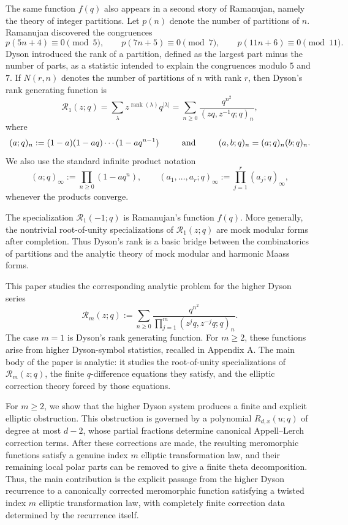 \documentclass[12pt]{amsart}
\numberwithin{equation}{section}
\begin{document}
The same function $f(q)$ also appears in a second story of Ramanujan, namely the theory of integer partitions.  Let $p(n)$ denote the number of partitions of $n$.  Ramanujan discovered the congruences
\[
p(5n+4)\equiv 0\pmod 5,\qquad
p(7n+5)\equiv 0\pmod 7,\qquad
p(11n+6)\equiv 0\pmod {11}.
\]
Dyson introduced the rank of a partition, defined as the largest part minus the number of parts, as a statistic intended to explain the congruences modulo $5$ and $7$.  If $N(r,n)$ denotes the number of partitions of $n$ with rank $r$, then Dyson's rank generating function is
\[
\mathcal{R}_1(z;q)=\sum_{\lambda}z^{\operatorname{rank}(\lambda)}q^{|\lambda|}
       =\sum_{n\geq 0}\frac{q^{n^2}}{(zq,z^{-1}q;q)_n},
\]
where
\begin{equation*}
(a;q)_n:=(1-a)(1-aq)\cdots (1-aq^{n-1}) \ \ \qquad {\text {\rm and}} \ \ \qquad
(a,b;q)_n=(a;q)_n (b;q)_n.
\end{equation*}
We also use the standard infinite product notation
\[
(a;q)_\infty := \prod_{n\geq 0}(1-aq^n),
\qquad
(a_1,\ldots,a_r;q)_\infty := \prod_{j=1}^r (a_j;q)_\infty,
\]
whenever the products converge.

The specialization $\mathcal{R}_1(-1;q)$ is Ramanujan's function $f(q)$.  More generally, the nontrivial root-of-unity specializations of $\mathcal{R}_1(z;q)$ are mock modular forms after completion.  Thus Dyson's rank is a basic bridge between the combinatorics of partitions and the analytic theory of mock modular and harmonic Maass forms.


This paper studies the corresponding analytic problem for the higher Dyson series
\begin{equation}\label{eq:intro-Rm}
\mathcal{R}_m(z;q):=\sum_{n\geq 0}
\frac{q^{n^2}}{\prod_{j=1}^m(z^jq,z^{-j}q;q)_n}.
\end{equation}
The case $m=1$ is Dyson's rank generating function.  For $m\geq 2$, these functions arise from higher Dyson-symbol statistics, recalled in Appendix A.  The main body of the paper is analytic: it studies the root-of-unity specializations of $\mathcal{R}_m(z;q)$, the finite $q$-difference equations they satisfy, and the elliptic correction theory forced by those equations.

For $m\geq 2$, we
show that the higher Dyson system produces a finite and explicit
elliptic obstruction.  This obstruction is governed by a polynomial
\(R_{d,x}(u;q)\) of degree at most \(d-2\), whose partial fractions determine
canonical Appell--Lerch correction terms.  After these corrections are made,
the resulting meromorphic functions satisfy a genuine index \(m\) elliptic
transformation law, and their remaining local polar parts can be removed to
give a finite theta decomposition. 
Thus, the main contribution is the explicit passage from the higher
Dyson recurrence to a canonically corrected meromorphic function satisfying a
twisted index \(m\) elliptic transformation law, with completely finite
correction data determined by the recurrence itself.
\end{document}
